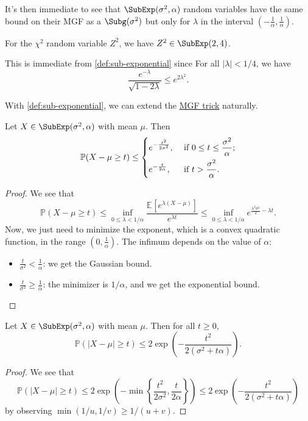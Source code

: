 It's then immediate to see that \(\SubExp(\sigma^2,\alpha)\) random variables have the same bound on their MGF as a \(\Subg(\sigma^2)\) but only for \(\lambda\) in the interval \((-\frac{1}{\alpha},\frac{1}{\alpha})\).

\begin{eg}
	For the \(\chi ^2\) random variable \(Z^2\), we have \(Z^2 \in \SubExp(2, 4) \).
\end{eg}
\begin{explanation}
	This is immediate from \autoref{def:sub-exponential} since For all \(\vert \lambda \vert < 1 / 4\), we have
	\[
		\frac{e^{-\lambda }}{\sqrt{1 - 2 \lambda } } \leq e^{2 \lambda ^{2} }.
	\]
\end{explanation}

With \autoref{def:sub-exponential}, we can extend the \hyperref[lma:MGF-trick]{MGF trick} naturally.

\begin{lemma}\label{lma:MGF-trick-SubExp}
	Let \(X \in \SubExp(\sigma ^{2} , \alpha ) \) with mean \(\mu \). Then
	\[
		\mathbb{P} (X - \mu \geq t) \leq
		\begin{dcases}
			e^{- \frac{t^2}{2 \sigma ^{2} }}, & \text{ if } 0 \leq t \leq \frac{\sigma ^{2}}{\alpha } ; \\
			e^{- \frac{t}{2\alpha }},         & \text{ if } t > \frac{\sigma ^{2} }{\alpha }.
		\end{dcases}
	\]
\end{lemma}
\begin{proof}
	We see that
	\[
		\mathbb{P} (X- \mu \geq t)
		\leq \inf _{0 \leq \lambda < 1 / \alpha } \frac{\mathbb{E}_{}\left[e^{\lambda (X - \mu )} \right] }{e^{\lambda t}}
		\leq \inf _{0 \leq \lambda < 1 / \alpha } e^{\frac{\lambda ^{2} \sigma ^{2} }{2} - \lambda t}.
	\]
	Now, we just need to minimize the exponent, which is a convex quadratic function, in the range \((0,\frac{1}{\alpha})\). The infimum depends on the value of \(\alpha\):
	\begin{itemize}
		\item \(\frac{t}{\sigma ^{2} } < \frac{1}{\alpha }\): we get the Gaussian bound.
		\item \(\frac{t}{\sigma ^{2} } \geq \frac{1}{\alpha }\): the minimizer is \(1 / \alpha \), and we get the exponential bound.
	\end{itemize}
\end{proof}

\begin{corollary}\label{col:MGF-trick-SubExp}
	Let \(X \in \SubExp(\sigma ^{2} , \alpha ) \) with mean \(\mu \). Then for all \(t \geq 0\),
	\[
		\mathbb{P} (\vert X - \mu  \vert \geq t) \leq 2 \exp \left( - \frac{t^2}{2(\sigma ^{2} + t \alpha )} \right).
	\]
\end{corollary}
\begin{proof}
	We see that
	\[
		\mathbb{P} (\vert X - \mu  \vert \geq t)
		\leq 2 \exp \left( - \min \left\{ \frac{t^2}{2 \sigma ^{2} }, \frac{t}{2\alpha } \right\}  \right)
		\leq 2 \exp \left( - \frac{t^2}{2(\sigma ^{2} + t \alpha )} \right)
	\]
	by observing \(\min (1 / u, 1 / v ) \geq 1 / (u + v)\).
\end{proof}


